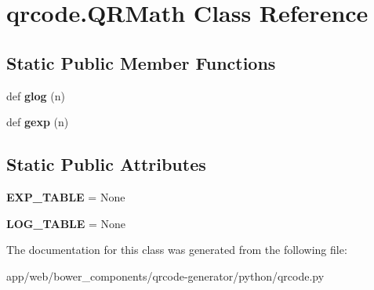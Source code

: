 \hypertarget{classqrcode_1_1_q_r_math}{}\section{qrcode.\+Q\+R\+Math Class Reference}
\label{classqrcode_1_1_q_r_math}
\subsection*{Static Public Member Functions}
\begin{DoxyCompactItemize}
\item 
\mbox{\label{classqrcode_1_1_q_r_math_a6ded818fc6e99361c7c308925e703b4d}} 
def {\bfseries glog} (n)
\item 
\mbox{\label{classqrcode_1_1_q_r_math_a3e86fa8de78f3ed9561dffeab14dddaf}} 
def {\bfseries gexp} (n)
\end{DoxyCompactItemize}
\subsection*{Static Public Attributes}
\begin{DoxyCompactItemize}
\item 
\mbox{\label{classqrcode_1_1_q_r_math_a924533df9ec6626bec041fb5187964aa}} 
{\bfseries E\+X\+P\+\_\+\+T\+A\+B\+LE} = None
\item 
\mbox{\label{classqrcode_1_1_q_r_math_a7e6e7653cc9a0a3dfbcfa83b5cb016e5}} 
{\bfseries L\+O\+G\+\_\+\+T\+A\+B\+LE} = None
\end{DoxyCompactItemize}


The documentation for this class was generated from the following file\+:\begin{DoxyCompactItemize}
\item 
app/web/bower\+\_\+components/qrcode-\/generator/python/qrcode.\+py\end{DoxyCompactItemize}
